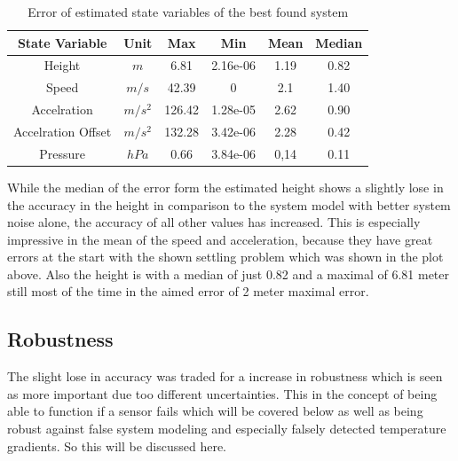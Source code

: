 \begin{table}[h!]
\centering
\begin{tabular}{cccccc}
\hline
\multicolumn{1}{|c|}{State Variable} & \multicolumn{1}{c|}{Unit} & \multicolumn{1}{c|}{Max} & \multicolumn{1}{c|}{Min} & \multicolumn{1}{c|}{Mean} & \multicolumn{1}{c|}{Median} \\ \hline
Height                            & $m$                         & 6.81	                  & 2.16e-06                 & 1.19                    & 0.82                      \\
Speed                             & $m/s$                       & 42.39                   & 0                        & 2.1                     & 1.40                      \\
Accelration                       & $m/s^2$   			& 126.42                  & 1.28e-05                 & 2.62                    & 0.90                     \\
Accelration Offset                & $m/s^2$   			& 132.28                  & 3.42e-06                 & 2.28                    & 0.42                     \\
Pressure		          & $hPa$   			& 0.66                    & 3.84e-06                 & 0,14                    & 0.11 
\end{tabular}
\caption{Error of estimated state variables of the best found system}
\label{tab:ErrorBestPerformanceSystem}
\end{table}

While the median of the error form the estimated height shows a slightly lose in the accuracy in the height in comparison to the system model with better system noise alone,
the accuracy of all other values has increased.
This is especially impressive in the mean of the speed and acceleration, because they have great errors at the start with the shown settling problem which was shown in the plot above. 
Also the height is with a median of just 0.82 and a maximal of 6.81 meter still most of the time in the aimed error of 2 meter maximal error.

\subsection{Robustness}
The slight lose in accuracy was traded for a increase in robustness which is seen as more important due too different uncertainties.
This in the concept of being able to function if a sensor fails which will be covered below as well as being robust against false system modeling 
and especially falsely detected temperature gradients. So this will be discussed here.

